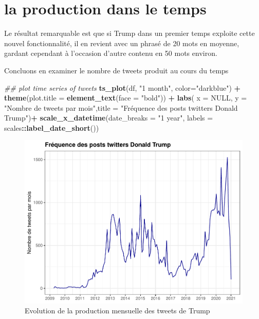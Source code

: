 \documentclass[
]{book}
\newenvironment{Shaded}{\begin{snugshade}}{\end{snugshade}}
\newcommand{\CommentTok}[1]{\textcolor[rgb]{0.56,0.35,0.01}{\textit{#1}}}
\newcommand{\DataTypeTok}[1]{\textcolor[rgb]{0.13,0.29,0.53}{#1}}
\newcommand{\KeywordTok}[1]{\textcolor[rgb]{0.13,0.29,0.53}{\textbf{#1}}}
\newcommand{\NormalTok}[1]{#1}
\newcommand{\OperatorTok}[1]{\textcolor[rgb]{0.81,0.36,0.00}{\textbf{#1}}}
\newcommand{\OtherTok}[1]{\textcolor[rgb]{0.56,0.35,0.01}{#1}}
\newcommand{\StringTok}[1]{\textcolor[rgb]{0.31,0.60,0.02}{#1}}
\begin{document}
\hypertarget{la-production-dans-le-temps}{%
\section{la production dans le temps}\label{la-production-dans-le-temps}}

Le résultat remarquable est que si Trump dans un premier temps exploite cette nouvel fonctionnalité, il en revient avec un phrasé de 20 mots en moyenne, gardant cependant à l'occasion d'autre contenu en 50 mots environ.

Concluons en examiner le nombre de tweets produit au cours du temps

\begin{Shaded}
\begin{Highlighting}[]
\CommentTok{## plot time series of tweets}
\KeywordTok{ts_plot}\NormalTok{(df, }\StringTok{"1 month"}\NormalTok{, }\DataTypeTok{color=}\StringTok{"darkblue"}\NormalTok{) }\OperatorTok{+}\StringTok{ }\KeywordTok{theme}\NormalTok{(}\DataTypeTok{plot.title =} \KeywordTok{element_text}\NormalTok{(}\DataTypeTok{face =} \StringTok{"bold"}\NormalTok{)) }\OperatorTok{+}\StringTok{ }
\StringTok{  }\KeywordTok{labs}\NormalTok{( }\DataTypeTok{x =} \OtherTok{NULL}\NormalTok{, }\DataTypeTok{y =} \StringTok{"Nombre de tweets par mois"}\NormalTok{,}\DataTypeTok{title =} \StringTok{"Fréquence des posts twitters Donald Trump"}\NormalTok{)}\OperatorTok{+}
\StringTok{  }\KeywordTok{scale_x_datetime}\NormalTok{(}\DataTypeTok{date_breaks =} \StringTok{"1 year"}\NormalTok{, }\DataTypeTok{labels =}\NormalTok{ scales}\OperatorTok{::}\KeywordTok{label_date_short}\NormalTok{())}
\end{Highlighting}
\end{Shaded}

\begin{figure}

{\centering \includegraphics[width=0.8\linewidth]{bookdown-demo_files/figure-latex/3-1} 

}

\caption{Evolution de la production mensuelle des tweets de Trump}\label{fig:3}
\end{figure}
\end{document}
